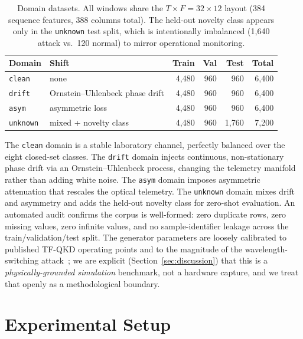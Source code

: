 \documentclass[runningheads]{llncs}
\begin{document}
\begin{table}[t]
\centering
\caption{Domain datasets. All windows share the $T{\times}F=32{\times}12$ layout (384 sequence features, 388 columns total). The held-out novelty class appears only in the \texttt{unknown} test split, which is intentionally imbalanced (1{,}640 attack vs.\ 120 normal) to mirror operational monitoring.}
\label{tab:datasets-inline}
\begin{tabular}{llrrrr}
\toprule
Domain & Shift & Train & Val & Test & Total \\
\midrule
\texttt{clean}   & none                & 4{,}480 & 960 & 960   & 6{,}400 \\
\texttt{drift}   & Ornstein--Uhlenbeck phase drift & 4{,}480 & 960 & 960   & 6{,}400 \\
\texttt{asym}    & asymmetric loss     & 4{,}480 & 960 & 960   & 6{,}400 \\
\texttt{unknown} & mixed + novelty class & 4{,}480 & 960 & 1{,}760 & 7{,}200 \\
\bottomrule
\end{tabular}
\end{table}

The \texttt{clean} domain is a stable laboratory channel, perfectly balanced over the eight closed-set classes. The \texttt{drift} domain injects continuous, non-stationary phase drift via an Ornstein--Uhlenbeck process, changing the telemetry manifold rather than adding white noise. The \texttt{asym} domain imposes asymmetric attenuation that rescales the optical telemetry. The \texttt{unknown} domain mixes drift and asymmetry and adds the held-out novelty class for zero-shot evaluation. An automated audit confirms the corpus is well-formed: zero duplicate rows, zero missing values, zero infinite values, and no sample-identifier leakage across the train/validation/test split. The generator parameters are loosely calibrated to published TF-QKD operating points and to the magnitude of the wavelength-switching attack~\cite{peng}; we are explicit (Section~\ref{sec:discussion}) that this is a \emph{physically-grounded simulation} benchmark, not a hardware capture, and we treat that openly as a methodological boundary.

\section{Experimental Setup}\label{sec:setup}
\end{document}
